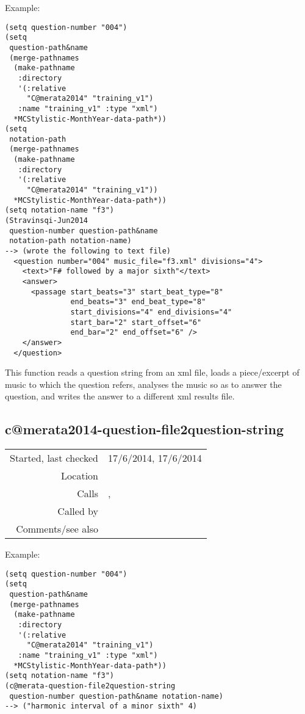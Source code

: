 \vspace{0.5cm}
\noindent Example:
\begin{verbatim}
(setq question-number "004")
(setq
 question-path&name
 (merge-pathnames
  (make-pathname
   :directory
   '(:relative
     "C@merata2014" "training_v1")
   :name "training_v1" :type "xml")
  *MCStylistic-MonthYear-data-path*))
(setq
 notation-path
 (merge-pathnames
  (make-pathname
   :directory
   '(:relative
     "C@merata2014" "training_v1"))
  *MCStylistic-MonthYear-data-path*))
(setq notation-name "f3")
(Stravinsqi-Jun2014
 question-number question-path&name
 notation-path notation-name)
--> (wrote the following to text file)
  <question number="004" music_file="f3.xml" divisions="4">
    <text>"F# followed by a major sixth"</text>
    <answer>
      <passage start_beats="3" start_beat_type="8"
               end_beats="3" end_beat_type="8"
               start_divisions="4" end_divisions="4"
               start_bar="2" start_offset="6"
               end_bar="2" end_offset="6" />
    </answer>
  </question>
\end{verbatim}

\noindent This function reads a question string from
an xml file, loads a piece/excerpt of music to which
the question refers, analyses the music so as to
answer the question, and writes the answer to a
different xml results file.


\subsection*{c@merata2014-question-file2question-string}\label{fun:c@merata2014-question-file2question-string}

\vspace{0.3cm}
\begin{tabular}{r|p{8cm}}
Started, last checked & 17/6/2014, 17/6/2014 \\
Location & \nameref{sec:c@merata-processing} \\
Calls & \nameref{fun:read-from-file-arbitrary}, \nameref{fun:replace-all} \\
Called by & \nameref{fun:Stravinsqi-Jun2014} \\
Comments/see also &
\end{tabular}

\vspace{0.5cm}
\noindent Example:
\begin{verbatim}
(setq question-number "004")
(setq
 question-path&name
 (merge-pathnames
  (make-pathname
   :directory
   '(:relative
     "C@merata2014" "training_v1")
   :name "training_v1" :type "xml")
  *MCStylistic-MonthYear-data-path*))
(setq notation-name "f3")
(c@merata-question-file2question-string
 question-number question-path&name notation-name)
--> ("harmonic interval of a minor sixth" 4)
\end{verbatim}

